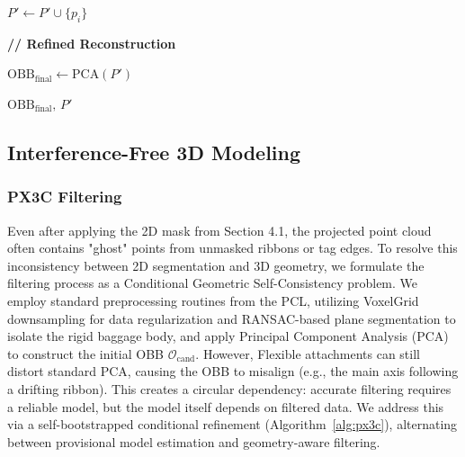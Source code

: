 \begin{algorithm}[t]
\begin{algorithmic}[1]

        \State $P' \gets P' \cup \{p_i\}$

    \EndIf

\EndFor

\State \textbf{// Refined Reconstruction}

\State $\mathrm{OBB}_{\text{final}} \gets \mathrm{PCA}(P')$

\State \Return $\mathrm{OBB}_{\text{final}},\,P'$

\end{algorithmic}
\end{algorithm}

\subsection{Interference-Free 3D Modeling}
\subsubsection{PX3C Filtering}
Even after applying the 2D mask from Section 4.1, the projected point cloud often contains "ghost" points from unmasked ribbons or tag edges. To resolve this inconsistency between 2D segmentation and 3D geometry, we formulate the filtering process as a Conditional Geometric Self-Consistency problem. We employ standard preprocessing routines from the PCL, utilizing VoxelGrid downsampling for data regularization and RANSAC-based plane segmentation to isolate the rigid baggage body, and apply Principal Component Analysis (PCA) to construct the initial OBB $\mathcal{O}_{\text{cand}}$. However, Flexible attachments can still distort standard PCA, causing the OBB to misalign (e.g., the main axis following a drifting ribbon). This creates a circular dependency: accurate filtering requires a reliable model, but the model itself depends on filtered data. We address this via a self-bootstrapped conditional refinement (Algorithm~\ref{alg:px3c}), alternating between provisional model estimation and geometry-aware filtering.

